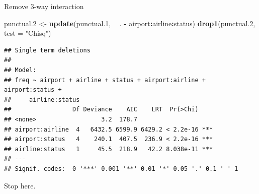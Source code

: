 \documentclass[ignorenonframetext,]{beamer}
\newenvironment{Shaded}{\begin{snugshade}}{\end{snugshade}}
\newcommand{\DataTypeTok}[1]{\textcolor[rgb]{0.13,0.29,0.53}{#1}}
\newcommand{\FloatTok}[1]{\textcolor[rgb]{0.00,0.00,0.81}{#1}}
\newcommand{\KeywordTok}[1]{\textcolor[rgb]{0.13,0.29,0.53}{\textbf{#1}}}
\newcommand{\NormalTok}[1]{#1}
\newcommand{\OperatorTok}[1]{\textcolor[rgb]{0.81,0.36,0.00}{\textbf{#1}}}
\newcommand{\StringTok}[1]{\textcolor[rgb]{0.31,0.60,0.02}{#1}}
\begin{document}
\begin{frame}[fragile]{Remove 3-way interaction}
\protect\hypertarget{remove-3-way-interaction}{}

\footnotesize

\begin{Shaded}
\begin{Highlighting}[]
\NormalTok{punctual}\FloatTok{.2}\NormalTok{ <-}\StringTok{ }\KeywordTok{update}\NormalTok{(punctual}\FloatTok{.1}\NormalTok{, }\OperatorTok{~}\StringTok{ }\NormalTok{. }\OperatorTok{-}\StringTok{ }\NormalTok{airport}\OperatorTok{:}\NormalTok{airline}\OperatorTok{:}\NormalTok{status)}
\KeywordTok{drop1}\NormalTok{(punctual}\FloatTok{.2}\NormalTok{, }\DataTypeTok{test =} \StringTok{"Chisq"}\NormalTok{)}
\end{Highlighting}
\end{Shaded}

\begin{verbatim}
## Single term deletions
## 
## Model:
## freq ~ airport + airline + status + airport:airline + airport:status + 
##     airline:status
##                 Df Deviance    AIC    LRT  Pr(>Chi)    
## <none>                  3.2  178.7                     
## airport:airline  4   6432.5 6599.9 6429.2 < 2.2e-16 ***
## airport:status   4    240.1  407.5  236.9 < 2.2e-16 ***
## airline:status   1     45.5  218.9   42.2 8.038e-11 ***
## ---
## Signif. codes:  0 '***' 0.001 '**' 0.01 '*' 0.05 '.' 0.1 ' ' 1
\end{verbatim}

\normalsize

Stop here.

\end{frame}
\end{document}
